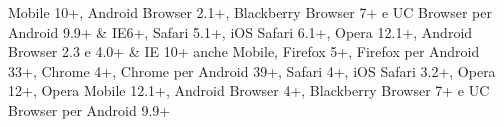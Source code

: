 \begin{landscape}
\begin{longtable}
Mobile 10+, Android Browser 2.1+, Blackberry Browser 7+ e UC Browser per Android 9.9+	& IE6+, Safari 5.1+, iOS Safari 6.1+, Opera 12.1+, Android Browser 2.3 e 4.0+	& IE 10+ anche Mobile, Firefox 5+, Firefox per Android 33+, Chrome 4+, Chrome per Android 39+, Safari 4+, iOS Safari 3.2+, Opera 12+, Opera Mobile 12.1+, Android Browser 4+, Blackberry Browser 7+ e UC Browser per Android 9.9+\\ \hline
\caption{Tabella di comparazione delle principali funzionalità offerte dai framework analizzati.}
\label{tabella:confrontoFramework}
\end{longtable}
\end{landscape}
